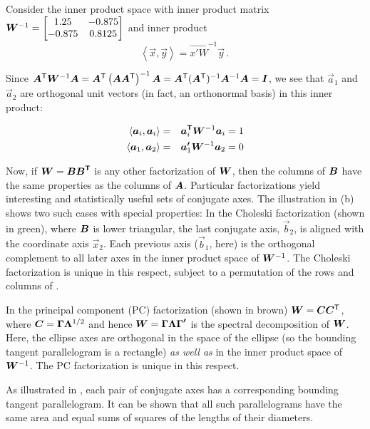 Consider the inner product space with inner product matrix 	 
$\bm{W}^{-1}=\left[ \begin{matrix}	 
1.25 & -0.875 \\	 
-0.875 & 0.8125 \\	 
\end{matrix} \right]
$ and inner product	 
\begin{equation*}
\left\langle \vec{x},\vec{y} \right\rangle =\vec{{x}'W}^{-1}\vec{y} \period
\end{equation*} 	 
	 
Since	 
$\bm{A}^\mathsf{T} \bm{W}^{-1}\bm{A}
=\bm{A}^\mathsf{T}\left( \bm{A}\bm{A}^\mathsf{T} \right)^{-1}\bm{A}
=\bm{A}^\mathsf{T}(\bm{A}^\mathsf{T})^{-1}\bm{A}^{-1}\bm{A}
=\bm{I}
$, 
we see that
$\vec{a}_{1}$ 
and	 
$\vec{a}_{2}$	 
are orthogonal unit vectors (in fact, an orthonormal basis) in this inner product:	 

\begin{eqnarray*}
\left\langle \vec{a}_{i},\vec{a}_{i} \right\rangle & = & \vec{{a}\trans}_{i}\mat{W}^{-1}\vec{a}_{i}=1	 \\
%	 
\left\langle \vec{a}_{1},\vec{a}_{2} \right\rangle & = &\vec{{a}'}_{1}\mat{W}^{-1}\vec{a}_{2}=0 
\end{eqnarray*}

 
Now, if $\bm{W}=\bm{B{B}^\mathsf{T}}$ is any other factorization of 
$\bm{W}$,
then the columns of 
$\bm{B}$
have the same properties as the columns of 
$\bm{A}$.
Particular factorizations yield interesting and statistically useful sets of conjugate axes.  
The illustration in (b) shows two such cases with special properties:
In the Choleski factorization (shown in green), where 
$\bm{B}$ is lower triangular, the last conjugate axis, $\vec{b}_2$, is aligned with the coordinate
axis $\vec{x}_2$.  Each previous axis ($\vec{b}_1$, here) is the orthogonal complement to
all later axes in the  inner product space of
$\bm{W}^{-1}$.  The Choleski factorization is unique in this respect, subject to a
permutation of the rows and columns of .

In the principal component (PC) factorization (shown in brown) $\bm{W}=\bm{C} \bm{C}^\mathsf{T}$, where
$\bm{C}=\bm{\Gamma \Lambda }^{1/2}$
and hence
$\bm{W}=\bm{\Gamma \Lambda {\Gamma }'}$ 
is the spectral decomposition of 
$\bm{W}$. Here, the ellipse axes are orthogonal in the space of the ellipse
(so the bounding tangent parallelogram is a rectangle) \emph{as well as} in the inner product space of
$\bm{W}^{-1}$. The PC factorization is unique in this respect.

As illustrated in , each pair of conjugate axes has a corresponding bounding tangent
parallelogram. It can be shown that all such parallelograms have the same area
and equal sums of squares of the lengths of their diameters.
